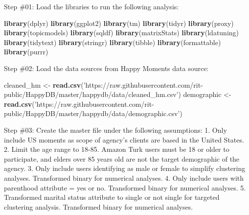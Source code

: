 \documentclass[]{article}
\newenvironment{Shaded}{\begin{snugshade}}{\end{snugshade}}
\newcommand{\KeywordTok}[1]{\textcolor[rgb]{0.13,0.29,0.53}{\textbf{#1}}}
\newcommand{\StringTok}[1]{\textcolor[rgb]{0.31,0.60,0.02}{#1}}
\newcommand{\NormalTok}[1]{#1}
\begin{document}
Step \#01: Load the libraries to run the following analysis:

\begin{Shaded}
\begin{Highlighting}[]
\KeywordTok{library}\NormalTok{(dplyr)}
\KeywordTok{library}\NormalTok{(ggplot2)}
\KeywordTok{library}\NormalTok{(tm)}
\KeywordTok{library}\NormalTok{(tidyr)}
\KeywordTok{library}\NormalTok{(proxy)}
\KeywordTok{library}\NormalTok{(topicmodels)}
\KeywordTok{library}\NormalTok{(sqldf)}
\KeywordTok{library}\NormalTok{(matrixStats)}
\KeywordTok{library}\NormalTok{(ldatuning)}
\KeywordTok{library}\NormalTok{(tidytext)}
\KeywordTok{library}\NormalTok{(stringr)}
\KeywordTok{library}\NormalTok{(tibble)}
\KeywordTok{library}\NormalTok{(formattable)}
\KeywordTok{library}\NormalTok{(purrr)}
\end{Highlighting}
\end{Shaded}

Step \#02: Load the data sources from Happy Moments data source:

\begin{Shaded}
\begin{Highlighting}[]
\NormalTok{cleaned_hm <-}\StringTok{ }\KeywordTok{read.csv}\NormalTok{(}\StringTok{'https://raw.githubusercontent.com/rit-public/HappyDB/master/happydb/data/cleaned_hm.csv'}\NormalTok{)}
\NormalTok{demographic <-}\StringTok{ }\KeywordTok{read.csv}\NormalTok{(}\StringTok{'https://raw.githubusercontent.com/rit-public/HappyDB/master/happydb/data/demographic.csv'}\NormalTok{)}
\end{Highlighting}
\end{Shaded}

Step \#03: Create the master file under the following assumptions: 1.
Only include US moments as scope of agency's clients are based in the
United States. 2. Limit the age range to 18-85. Amazon Turk users must
be 18 or older to participate, and elders over 85 years old are not the
target demographic of the agency. 3. Only include users identifying as
male or female to simplify clustering analyses. Transformed binary for
numerical analyses. 4. Only include users with parenthood attribute =
yes or no. Transformed binary for numerical analyses. 5. Transformed
marital status attribute to single or not single for targeted clustering
analysis. Transformed binary for numerical analyses.
\end{document}
